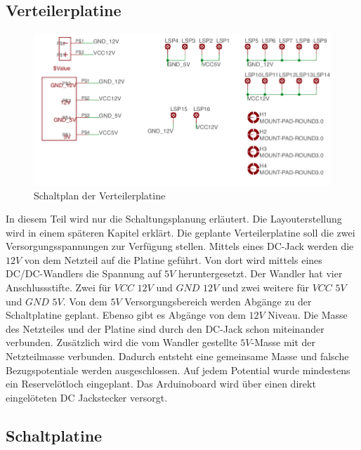 \subsection{Verteilerplatine}

\begin{figure}[ht]
    \centering
    \includegraphics[width=\textwidth]{silas/verteiler1}
    \caption{Schaltplan der Verteilerplatine}
\end{figure}

In diesem Teil wird nur die Schaltungsplanung erläutert. Die Layouterstellung wird in einem späteren
Kapitel erklärt.
Die geplante Verteilerplatine soll die zwei Versorgungsspannungen zur Verfügung stellen.
Mittels eines DC-Jack werden die $12V$ von dem Netzteil auf die Platine geführt.
Von dort wird mittels eines DC/DC-Wandlers die Spannung auf $5V$
heruntergesetzt. Der Wandler hat vier Anschlussstifte. Zwei für $VCC$ $12V$ und $GND$ $12V$ und zwei
weitere für $VCC$ $5V$ und $GND$ $5V$. Von dem $5V$ Versorgungsbereich werden Abgänge zu der
Schaltplatine geplant. Ebenso gibt es Abgänge von dem $12V$ Niveau.
Die Masse des Netzteiles und der Platine sind durch den DC-Jack schon miteinander verbunden.
Zusätzlich wird die vom Wandler gestellte $5V$-Masse mit der Netzteilmasse verbunden. Dadurch
entsteht eine gemeinsame Masse und falsche Bezugspotentiale
werden ausgeschlossen. Auf jedem Potential wurde mindestens ein Reservelötloch eingeplant.
Das Arduinoboard wird über einen direkt eingelöteten DC Jackstecker versorgt.

\subsection{Schaltplatine}

